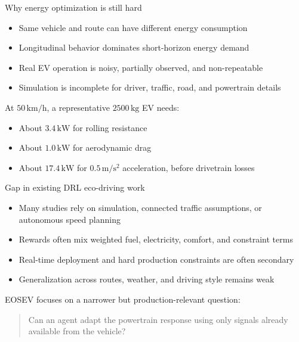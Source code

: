 \documentclass[aspectratio=169,professionalfonts]{beamer}
\begin{document}
\begin{frame}[label={sec:org29ec1b5}]{Why energy optimization is still hard}
\begin{itemize}
\item Same vehicle and route can have different energy consumption
\item Longitudinal behavior dominates short-horizon energy demand
\item Real EV operation is noisy, partially observed, and non-repeatable
\item Simulation is incomplete for driver, traffic, road, and powertrain
details
\end{itemize}

\vspace{0.5em}

At \(50\,\mathrm{km/h}\), a representative \(2500\,\mathrm{kg}\) EV needs:

\begin{itemize}
\item About \(3.4\,\mathrm{kW}\) for rolling resistance
\item About \(1.0\,\mathrm{kW}\) for aerodynamic drag
\item About \(17.4\,\mathrm{kW}\) for \(0.5\,\mathrm{m/s^2}\) acceleration,
before drivetrain losses
\end{itemize}
\end{frame}
\begin{frame}[label={sec:org2ec8cce}]{Gap in existing DRL eco-driving work}
\begin{itemize}
\item Many studies rely on simulation, connected traffic assumptions, or
autonomous speed planning
\item Rewards often mix weighted fuel, electricity, comfort, and constraint
terms
\item Real-time deployment and hard production constraints are often
secondary
\item Generalization across routes, weather, and driving style remains weak
\end{itemize}

\vspace{0.5em}

EOSEV focuses on a narrower but production-relevant question:

\begin{quote}
Can an agent adapt the powertrain response using only signals already
available from the vehicle?
\end{quote}
\end{frame}
\end{document}
